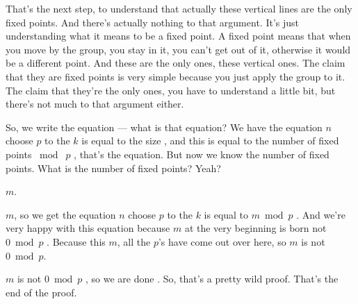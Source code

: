 \begin{proofWrapper}
\begin{speech}[01:05:10 - 01:06:15]
That's the next step, to understand that actually these vertical lines are the only fixed points. And there's actually nothing to that argument. It's just understanding what it means to be a fixed point. A fixed point means that when you move by the group, you stay in it, you can't get out of it, otherwise it would be a different point. And these are the only ones, these vertical ones. The claim that they are fixed points is very simple because you just apply the group to it. The claim that they're the only ones, you have to understand a little bit, but there's not much to that argument either.

So, we write the equation --- what is that equation? We have the equation $n$ choose $p$ to the $k$ is equal to the size , and this is equal to the number of fixed points $\bmod\; p$ , that's the equation. But now we know the number of fixed points. What is the number of fixed points? Yeah?
\end{speech}

\begin{student}
$m$.
\end{student}

\begin{speech}[01:06:17 - 01:06:51]
$m$, so we get the equation $n$ choose $p$ to the $k$ is equal to $m \bmod p$ . And we're very happy with this equation because $m$ at the very beginning is born not $0 \bmod p$ . Because this $m$, all the $p$'s have come out over here, so $m$ is not $0 \bmod p$.

$m$ is not $0 \bmod p$ , so we are done . So, that's a pretty wild proof. That's the end of the proof.
\end{speech}

\begin{content}


\end{content}
\end{proofWrapper}
